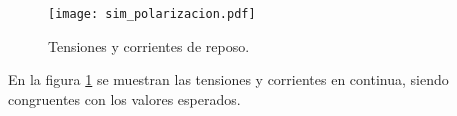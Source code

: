 \begin{figure}[H]
	\centering
	\texttt{[image: sim\_polarizacion.pdf]}
	\caption{Tensiones y corrientes de reposo.}
	\label{fig:sim_pol}
\end{figure}


En la figura \ref{fig:sim_pol} se muestran las tensiones y corrientes en continua, siendo congruentes con los valores esperados.

